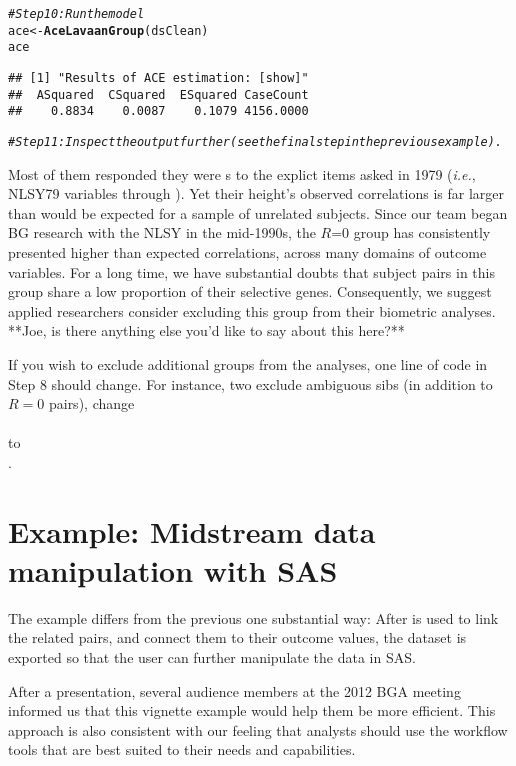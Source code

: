 \documentclass{article}\usepackage[]{graphicx}\usepackage[]{color}
\makeatletter
\newcommand{\hlcom}[1]{\textcolor[rgb]{0.678,0.584,0.686}{\textit{#1}}}%
\newcommand{\hlstd}[1]{\textcolor[rgb]{0.345,0.345,0.345}{#1}}%
\newcommand{\hlkwb}[1]{\textcolor[rgb]{0.69,0.353,0.396}{#1}}%
\newcommand{\hlkwd}[1]{\textcolor[rgb]{0.737,0.353,0.396}{\textbf{#1}}}%
\newenvironment{kframe}{%
 \def\at@end@of@kframe{}%
 \ifinner\ifhmode%
  \def\at@end@of@kframe{\end{minipage}}%
  \begin{minipage}{\columnwidth}%
 \fi\fi%
 \def\FrameCommand##1{\hskip\@totalleftmargin \hskip-\fboxsep
 \colorbox{shadecolor}{##1}\hskip-\fboxsep
     \hskip-\linewidth \hskip-\@totalleftmargin \hskip\columnwidth}%
 \MakeFramed {\advance\hsize-\width
   \@totalleftmargin\z@ \linewidth\hsize
   \@setminipage}}%
 {\par\unskip\endMakeFramed%
 \at@end@of@kframe}
\newenvironment{knitrout}{}{} %
\makeatother
\begin{document}
\begin{knitrout}
\begin{kframe}
\begin{alltt}
\hlcom{#Step 10: Run the model}
\hlstd{ace} \hlkwb{<-} \hlkwd{AceLavaanGroup}\hlstd{(dsClean)}
\hlstd{ace}
\end{alltt}
\begin{verbatim}
## [1] "Results of ACE estimation: [show]"
##  ASquared  CSquared  ESquared CaseCount 
##    0.8834    0.0087    0.1079 4156.0000
\end{verbatim}
\begin{alltt}
\hlcom{#Step 11: Inspect the output further (see the final step in the previous example).}
\end{alltt}
\end{kframe}
\end{knitrout}


Most of them responded they were s  to the explict items asked in 1979 (\emph{i.e.}, NLSY79 variables  through ).  Yet their height's observed correlations is far larger than would be expected for a sample of unrelated subjects.  Since our team began BG research with the NLSY in the mid-1990s, the $R$=0 group has consistently presented higher than expected correlations, across many domains of outcome variables.  For a long time, we have substantial doubts that subject pairs in this group share a low proportion of their selective genes.  Consequently, we suggest applied researchers consider excluding this group from their biometric analyses.  **Joe, is there anything else you'd like to say about this here?**

If you wish to exclude additional groups from the analyses, one line of code in Step 8 should change.  For instance, two exclude ambiguous sibs (in addition to $R=0$ pairs), change\\  \\to \\ .

\section{Example: Midstream data manipulation with SAS}
The example differs from the previous one substantial way: After \R{} is used to link the related pairs, and connect them to their outcome values, the dataset is exported so that the user can further manipulate the data in SAS.  

After a presentation, several audience members at the 2012 BGA meeting informed us that this vignette example would help them be more efficient.  This approach is also consistent with our feeling that analysts should use the workflow tools that are best suited to their needs and capabilities.
\end{document}
